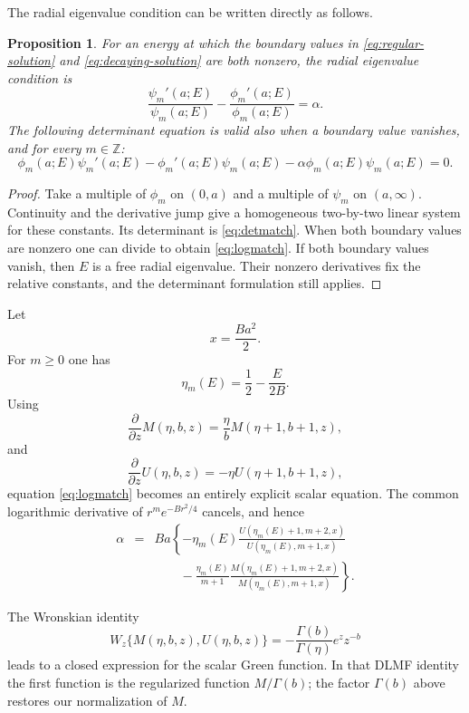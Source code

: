 \documentclass[12pt,a4paper]{article}
\numberwithin{equation}{section}
\newtheorem{prop}[thm]{Proposition}
\theoremstyle{remark}
\theoremstyle{definition}
\newcommand{\Mfun}{M}
\newcommand{\Ufun}{U}
\begin{document}
The radial eigenvalue condition can be written directly as follows.

\begin{prop}\label{prop:matching}
For an energy at which the boundary values in
\eqref{eq:regular-solution} and \eqref{eq:decaying-solution} are both nonzero,
the radial
eigenvalue condition is
\begin{equation}\label{eq:logmatch}
\frac{\psi_m'(a;E)}{\psi_m(a;E)}
-\frac{\phi_m'(a;E)}{\phi_m(a;E)}
=\alpha.
\end{equation}
The following determinant equation is valid also when a boundary value
vanishes, and for every $m\in\mathbb Z$:
\begin{equation}\label{eq:detmatch}
\phi_m(a;E)\psi_m'(a;E)
-\phi_m'(a;E)\psi_m(a;E)
-\alpha\phi_m(a;E)\psi_m(a;E)=0.
\end{equation}
\end{prop}

\begin{proof}
Take a multiple of $\phi_m$ on $(0,a)$ and a multiple of $\psi_m$ on
$(a,\infty)$. Continuity and the derivative jump give a homogeneous two-by-two
linear system for these constants. Its determinant is
\eqref{eq:detmatch}. When both boundary values are nonzero one can divide
to obtain \eqref{eq:logmatch}. If both boundary values vanish, then $E$ is
a free radial eigenvalue. Their nonzero derivatives fix the relative
constants, and the determinant formulation still applies.
\end{proof}

Let
$$
x=\frac{Ba^2}{2}.
$$
For $m\ge0$ one has
$$
\eta_m(E)=\frac12-\frac{E}{2B}.
$$
Using
$$
\frac{\partial}{\partial z}\Mfun(\eta,b,z)
=\frac{\eta}{b}\Mfun(\eta+1,b+1,z),
$$
and
$$
\frac{\partial}{\partial z}\Ufun(\eta,b,z)
=-\eta\Ufun(\eta+1,b+1,z),
$$
equation \eqref{eq:logmatch} becomes an entirely explicit scalar equation.
The common logarithmic derivative of $r^m e^{-Br^2/4}$ cancels, and hence
\begin{eqnarray}
\alpha
&=&Ba\left\{
-\eta_m(E)
\frac{\Ufun(\eta_m(E)+1,m+2,x)}
{\Ufun(\eta_m(E),m+1,x)}\right.\nonumber\\
&&\left.\qquad
-\frac{\eta_m(E)}{m+1}
\frac{\Mfun(\eta_m(E)+1,m+2,x)}
{\Mfun(\eta_m(E),m+1,x)}
\right\}.
\label{eq:kummer-match}
\end{eqnarray}

The Wronskian identity \cite[Eq.~13.2.34]{DLMF}
$$
W_z\{\Mfun(\eta,b,z),\Ufun(\eta,b,z)\}
=-\frac{\Gamma(b)}{\Gamma(\eta)}e^z z^{-b}
$$
leads to a closed expression for the scalar Green function. In that DLMF
identity the first function is the regularized function $M/\Gamma(b)$;
the factor $\Gamma(b)$ above restores our normalization of $M$.
\end{document}
